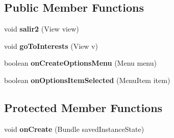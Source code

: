 \subsection*{Public Member Functions}
\begin{DoxyCompactItemize}
\item 
void {\bfseries salir2} (View view)\hypertarget{classcom_1_1example_1_1sebastian_1_1tindertp_1_1RegistryActivity_ab14da5456c8d71fdbbb9c65fd33a4f85}{}\label{classcom_1_1example_1_1sebastian_1_1tindertp_1_1RegistryActivity_ab14da5456c8d71fdbbb9c65fd33a4f85}

\item 
void {\bfseries go\+To\+Interests} (View v)\hypertarget{classcom_1_1example_1_1sebastian_1_1tindertp_1_1RegistryActivity_a183ff820fa3588697c4542f58515c0c2}{}\label{classcom_1_1example_1_1sebastian_1_1tindertp_1_1RegistryActivity_a183ff820fa3588697c4542f58515c0c2}

\item 
boolean {\bfseries on\+Create\+Options\+Menu} (Menu menu)\hypertarget{classcom_1_1example_1_1sebastian_1_1tindertp_1_1RegistryActivity_a5366ab0d988d6382e5edb9de82ef456a}{}\label{classcom_1_1example_1_1sebastian_1_1tindertp_1_1RegistryActivity_a5366ab0d988d6382e5edb9de82ef456a}

\item 
boolean {\bfseries on\+Options\+Item\+Selected} (Menu\+Item item)\hypertarget{classcom_1_1example_1_1sebastian_1_1tindertp_1_1RegistryActivity_a909c6c3d689e7f07d409ab0dad1b7614}{}\label{classcom_1_1example_1_1sebastian_1_1tindertp_1_1RegistryActivity_a909c6c3d689e7f07d409ab0dad1b7614}

\end{DoxyCompactItemize}
\subsection*{Protected Member Functions}
\begin{DoxyCompactItemize}
\item 
void {\bfseries on\+Create} (Bundle saved\+Instance\+State)\hypertarget{classcom_1_1example_1_1sebastian_1_1tindertp_1_1RegistryActivity_a238ec2c0a37bef50d5899980803cc946}{}\label{classcom_1_1example_1_1sebastian_1_1tindertp_1_1RegistryActivity_a238ec2c0a37bef50d5899980803cc946}

\end{DoxyCompactItemize}
